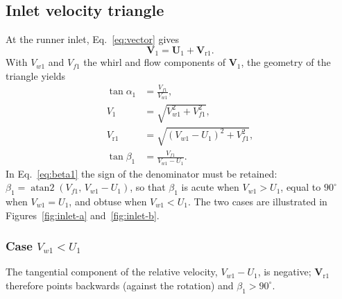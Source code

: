 \documentclass[11pt,a4paper]{article}
\numberwithin{equation}{section}
\newcommand{\vr}{\mathrm{r}}
\newcommand{\vvec}[1]{\bm{#1}}
\begin{document}
\subsection{Inlet velocity triangle}
\label{sec:inlet}

At the runner inlet, Eq.~\eqref{eq:vector} gives
\begin{equation}
  \vvec{V}_1 = \vvec{U}_1 + \vvec{V}_{\vr 1}.
  \label{eq:inlet-vec}
\end{equation}
With $V_{w1}$ and $V_{f1}$ the whirl and flow components of $\vvec{V}_1$, the geometry of the triangle yields
\begin{align}
  \tan\alpha_1 &= \frac{V_{f1}}{V_{w1}}, \label{eq:alpha1}\\
  V_1 &= \sqrt{V_{w1}^{2} + V_{f1}^{2}}, \label{eq:V1}\\
  V_{\vr 1} &= \sqrt{(V_{w1}-U_1)^{2} + V_{f1}^{2}}, \label{eq:Vr1}\\
  \tan\beta_1 &= \frac{V_{f1}}{V_{w1}-U_1}. \label{eq:beta1}
\end{align}
In Eq.~\eqref{eq:beta1} the sign of the denominator must be retained: $\beta_1 = \operatorname{atan2}(V_{f1},\,V_{w1}-U_1)$, so that $\beta_1$ is acute when $V_{w1} > U_1$, equal to $90^\circ$ when $V_{w1} = U_1$, and obtuse when $V_{w1} < U_1$. The two cases are illustrated in Figures~\ref{fig:inlet-a} and~\ref{fig:inlet-b}.

\subsubsection{Case \texorpdfstring{$V_{w1} < U_1$}{Vw1 < U1}}

The tangential component of the relative velocity, $V_{w1}-U_1$, is negative; $\vvec{V}_{\vr 1}$ therefore points backwards (against the rotation) and $\beta_1 > 90^\circ$.
\end{document}
